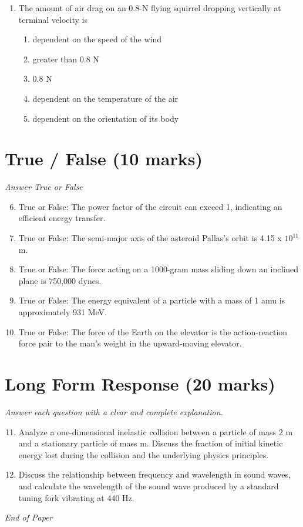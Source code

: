 \documentclass[12pt]{article}
\begin{document}
\begin{enumerate}[label=\arabic*.]
\begin{enumerate}[label=(\alph*)]
    \item remains the same
    \item halves
    \item quadruples
\end{enumerate}
\item The amount of air drag on an 0.8-N flying squirrel dropping vertically at terminal velocity is
\begin{enumerate}[label=(\alph*)]
    \item dependent on the speed of the wind
    \item greater than 0.8 N
    \item 0.8 N
    \item dependent on the temperature of the air
    \item dependent on the orientation of its body
\end{enumerate}
\end{enumerate}

\section*{True / False (10 marks)}
\textit{Answer True or False}
\begin{enumerate}[label=\arabic*.]
\setcounter{enumi}{5}
\item True or False: The power factor of the circuit can exceed 1, indicating an efficient energy transfer.
\item True or False: The semi-major axis of the asteroid Pallas's orbit is 4.15 x $10^11$ m.
\item True or False: The force acting on a 1000-gram mass sliding down an inclined plane is 750,000 dynes.
\item True or False: The energy equivalent of a particle with a mass of 1 amu is approximately 931 MeV.
\item True or False: The force of the Earth on the elevator is the action-reaction force pair to the man's weight in the upward-moving elevator.
\end{enumerate}

\section*{Long Form Response (20 marks)}
\textit{Answer each question with a clear and complete explanation.}
\begin{enumerate}[label=\arabic*.]
\setcounter{enumi}{10}
\item Analyze a one-dimensional inelastic collision between a particle of mass 2 m and a stationary particle of mass m. Discuss the fraction of initial kinetic energy lost during the collision and the underlying physics principles.
\item Discuss the relationship between frequency and wavelength in sound waves, and calculate the wavelength of the sound wave produced by a standard tuning fork vibrating at 440 Hz.
\end{enumerate}

\vfill
\noindent\textit{End of Paper}
\end{document}
